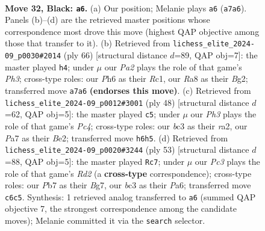 \documentclass[11pt]{article}
\begin{document}
\clearpage

\begin{figure}[p]\centering
\begin{subfigure}{0.46\textwidth}\centering
\resizebox{\linewidth}{!}{%
\newchessgame
\chessboard[
  setfen={rk3b2/pp4pr/2p1b2p/P4p2/2pP3P/2B1P3/1P3PPN/RK5R b - - 1 32},
  showmover=false,
  pgfstyle=straightmove, color=movearrow, markmove={a7-a6}
]}
\caption{}
\end{subfigure}\hfill
\begin{subfigure}{0.46\textwidth}\centering
\resizebox{\linewidth}{!}{%
\newchessgame
\chessboard[
  setfen={r5k1/2p2p1n/2Pp2p1/1p1P3p/1P1b1P2/p5PP/P5BK/2R2R2 w - - 0 34},
  showmover=false,
  pgfstyle=straightmove, color=movearrow, markmove={h3-h4}
]}
\caption{}
\end{subfigure}
\\[4pt]
\begin{subfigure}{0.46\textwidth}\centering
\resizebox{\linewidth}{!}{%
\newchessgame
\chessboard[
  setfen={2b1r1k1/1p3p1p/2pBn1p1/8/2P1P3/2R2P2/r3B1PP/4R2K w - - 2 25},
  showmover=false,
  pgfstyle=straightmove, color=movearrow, markmove={c4-c5}
]}
\caption{}
\end{subfigure}\hfill
\begin{subfigure}{0.46\textwidth}\centering
\resizebox{\linewidth}{!}{%
\newchessgame
\chessboard[
  setfen={3r2k1/1p1r1pbp/p3p1p1/P7/RP1pP3/3P1P1P/4K1P1/1N1R4 b - - 1 27},
  showmover=false,
  pgfstyle=straightmove, color=movearrow, markmove={d7-c7}
]}
\caption{}
\end{subfigure}
\caption{\textbf{Move 32, Black: \texttt{a6}.} (a) Our position; Melanie plays \texttt{a6} (\texttt{a7a6}). Panels (b)--(d) are the retrieved master positions whose correspondence most drove this move (highest QAP objective among those that transfer to it). (b) Retrieved from \texttt{lichess\_elite\_2024-09\_p0030\#2014} (ply 66) [structural distance $d$=89, QAP obj=7]: the master played \texttt{h4}; under $\mu$ our \emph{Pa2} plays the role of that game's \emph{Ph3}; cross-type roles: our \emph{P}h6 as their \emph{R}c1, our \emph{R}a8 as their \emph{B}g2; transferred move \texttt{a7a6} \textbf{(endorses this move)}. (c) Retrieved from \texttt{lichess\_elite\_2024-09\_p0012\#3001} (ply 48) [structural distance $d$=62, QAP obj=5]: the master played \texttt{c5}; under $\mu$ our \emph{Ph3} plays the role of that game's \emph{Pc4}; cross-type roles: our \emph{b}c3 as their \emph{r}a2, our \emph{P}a7 as their \emph{B}e2; transferred move \texttt{h6h5}. (d) Retrieved from \texttt{lichess\_elite\_2024-09\_p0020\#3244} (ply 53) [structural distance $d$=88, QAP obj=5]: the master played \texttt{Rc7}; under $\mu$ our \emph{Pc3} plays the role of that game's \emph{Rd2} (a \textbf{cross-type} correspondence); cross-type roles: our \emph{P}b7 as their \emph{B}g7, our \emph{b}c3 as their \emph{P}a6; transferred move \texttt{c6c5}. Synthesis: 1 retrieved analog transferred to \texttt{a6} (summed QAP objective 7, the strongest correspondence among the candidate moves); Melanie committed it via the \texttt{search} selector.}
\label{fig:thought-m63}
\end{figure}
\end{document}
